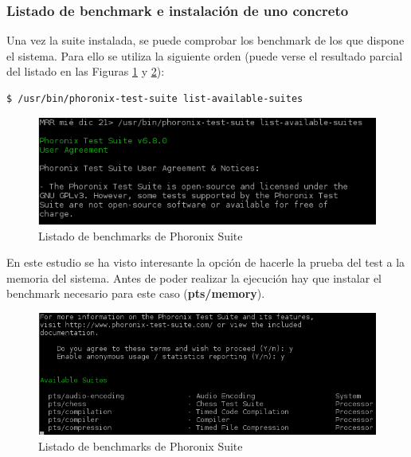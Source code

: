 \subsubsection{Listado de benchmark e instalación de uno concreto}

Una vez la suite instalada, se puede comprobar los benchmark de los que dispone el sistema. Para ello se utiliza la siguiente orden (puede verse el resultado parcial del listado en las Figuras \ref{fig:figura1-5} y \ref{fig:figura1-6}):
\begin{lstlisting}[style=fich]
$ /usr/bin/phoronix-test-suite list-available-suites
\end{lstlisting}
\vspace{-28pt}

\begin{figure}[H] %
	\centering
	\includegraphics[scale=1]{figuras/ejercicio1/figura1-5.png} 
	\caption{Listado de benchmarks de Phoronix Suite} 
	\label{fig:figura1-5}
\end{figure}

En este estudio se ha visto interesante la opción de hacerle la prueba del test a la memoria del sistema. Antes de poder realizar la ejecución hay que instalar el benchmark necesario para este caso (\textbf{pts/memory}).

\begin{figure}[H] %
	\centering
	\includegraphics[scale=0.9]{figuras/ejercicio1/figura1-6.png} 
	\caption{Listado de benchmarks de Phoronix Suite} 
	\label{fig:figura1-6}
\end{figure}


